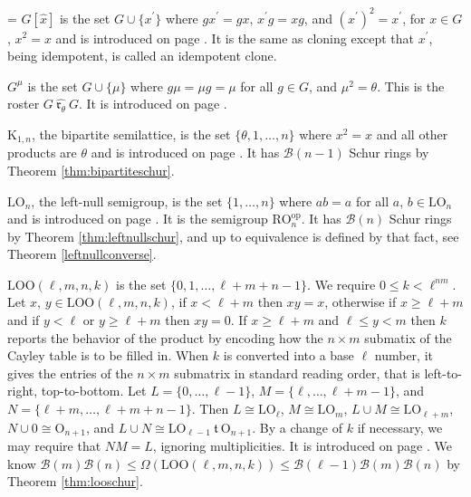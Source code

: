 \documentclass{article}
\makeatletter
\newcommand{\hangpara}[2]{\hangindent#1\hangafter#2\noindent}
\newenvironment{hangparas}[2]{\setlength{\parindent}{\z@}
  \everypar={\hangpara{#1}{#2}}}{\par}
\theoremstyle{plain}
\theoremstyle{definition}
\newcommand{\thmref}[1]{Theorem \ref{#1}}
\newcommand{\I}{\mathscr{I}}
\newcommand{\B}{\mathscr{B}}
\renewcommand{\O}{\mathrm{O}}
\newcommand{\K}{\mathrm{K}}
\newcommand{\LO}{\mathrm{LO}}
\newcommand{\RO}{\mathrm{RO}}
\newcommand{\LOO}{\mathrm{LOO}}
\renewcommand{\t}{\ \mathfrak{t}\ }
\newcommand{\rhat}[1]{\ \widehat{\mathfrak{r}_{#1}}\ }
\makeatother
\begin{document}
\begin{hangparas}{15pt}{1}
$G[\hat{x}]$ is the set $G\cup \{x^\prime\}$ where $gx^\prime = gx$, $x^\prime g = xg$, and $(x^\prime)^2=x^\prime$, for $x\in G$, $x^2=x$ and is introduced on page \pageref{Iclone}. It is the same as cloning except that $x^\prime$, being idempotent, is called an idempotent clone.

$G^\mu$ is the set $G \cup \{\mu\}$ where $g\mu = \mu g = \mu$ for all $g\in G$, and $\mu^2 =\theta$. This is the roster $G\rhat{\theta} G$. It is introduced on page \pageref{dualclone}.



$\K_{1,n}$, the bipartite semilattice, is the set $\{\theta, 1, \ldots, n\}$ where $x^2=x$ and all other products are $\theta$ and is introduced on page \pageref{bipart}. It has $\B(n-1)$ Schur rings by \thmref{thm:bipartiteschur}.


$\LO_n$, the left-null semigroup, is the set $\{1, \ldots, n\}$ where $ab=a$ for all $a$, $b\in \LO_n$ and is introduced on page \pageref{lnull}. It is the semigroup $\RO_n^\text{op}$. It has $\B(n)$ Schur rings by \thmref{thm:leftnullschur}, and up to equivalence is defined by that fact, see \thmref{leftnullconverse}.

$\LOO(\ell, m, n, k)$ is the set $\{0, 1, \ldots, \ell+m+n-1\}$. We require $0\le k<\ell^{nm}$. Let $x$, $y\in\LOO(\ell, m, n, k)$, if $x<\ell+m$ then $xy=x$, otherwise if $x\geq \ell+m$ and if $y<\ell$ or $y\geq\ell+m$ then $xy=0$. If $x\geq \ell+m$ and $\ell\leq y < m$ then $k$ reports the behavior of the product by encoding how the $n\times m$ submatix of the Cayley table is to be filled in.  When $k$ is converted into a base $\ell$ number, it gives the entries of the $n\times m$ submatrix in standard reading order, that is left-to-right, top-to-bottom. Let $L=\{0,\ldots, \ell-1\}$, $M=\{\ell, \ldots, \ell+m-1\}$, and $N=\{\ell+m,\ldots, \ell+m+n-1\}$. Then $L\cong \LO_\ell$, $M\cong \LO_m$, $L\cup M\cong \LO_{\ell+m}$, $N\cup 0 \cong \O_{n+1}$, and $L\cup N\cong \LO_{\ell-1}\t \O_{n+1}$. By a change of $k$ if necessary, we may require that $NM=L$, ignoring multiplicities. It is introduced on page \pageref{loo}. We know $\B(m)\B(n) \le \Omega(\LOO(\ell,m,n,k))\le \B(\ell-1)\B(m)\B(n)$ by \thmref{thm:looschur}.


\end{hangparas}
\end{document}
